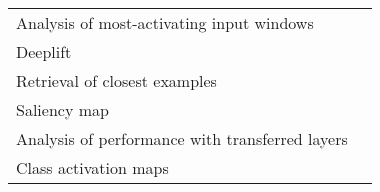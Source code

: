 \begin{tabular}{ll}
Analysis of most-activating input windows              &                                                                                                                                                                              \cite{Hartmann2018b} \\
Deeplift                                               &                                                                                                                                                                                \cite{Lawhern2018} \\
Retrieval of closest examples                          &                                                                                                                                                                                  \cite{Deiss2018} \\
Saliency map                                           &                                                                                                                                                                               \cite{Vilamala2017} \\
Analysis of performance with transferred layers        &                                                                                                                                                                            \cite{Hajinoroozi2017} \\
Class activation maps                                  &                                                                                                                                                                                  \cite{Ghosh2018} \\
\bottomrule
\end{tabular}

